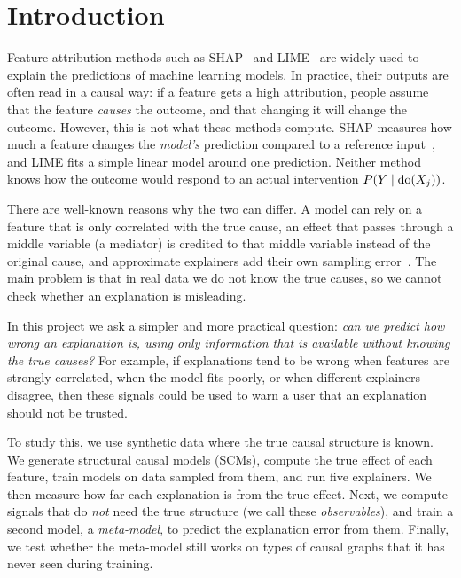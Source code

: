 \section{Introduction}
Feature attribution methods such as SHAP~\cite{lundberg2017} and LIME~\cite{ribeiro2016} are widely used to explain the predictions of machine learning models. In practice, their outputs are often read in a causal way: if a feature gets a high attribution, people assume that the feature \emph{causes} the outcome, and that changing it will change the outcome. However, this is not what these methods compute. SHAP measures how much a feature changes the \emph{model's} prediction compared to a reference input~\cite{janzing2020}, and LIME fits a simple linear model around one prediction. Neither method knows how the outcome would respond to an actual intervention $P(Y \mid \operatorname{do}(X_j))$.

There are well-known reasons why the two can differ. A model can rely on a feature that is only correlated with the true cause, an effect that passes through a middle variable (a mediator) is credited to that middle variable instead of the original cause, and approximate explainers add their own sampling error~\cite{krishna2022}. The main problem is that in real data we do not know the true causes, so we cannot check whether an explanation is misleading.

In this project we ask a simpler and more practical question: \emph{can we predict how wrong an explanation is, using only information that is available without knowing the true causes?} For example, if explanations tend to be wrong when features are strongly correlated, when the model fits poorly, or when different explainers disagree, then these signals could be used to warn a user that an explanation should not be trusted.

To study this, we use synthetic data where the true causal structure is known. We generate structural causal models (SCMs), compute the true effect of each feature, train models on data sampled from them, and run five explainers. We then measure how far each explanation is from the true effect. Next, we compute signals that do \emph{not} need the true structure (we call these \emph{observables}), and train a second model, a \emph{meta-model}, to predict the explanation error from them. Finally, we test whether the meta-model still works on types of causal graphs that it has never seen during training.

